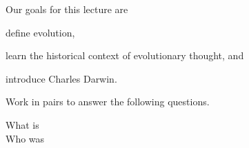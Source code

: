 \documentclass[t]{beamer}
\begin{document}
\begin{frame}{Our goals for this lecture are}
	
	\hangpara define evolution, 
	
	\hangpara learn the historical context of evolutionary thought, and

	\hangpara introduce Charles Darwin.

\end{frame}

%

%
\begin{frame}[t,plain]{Work in pairs to answer the following questions.}
	\vspace{2ex}
	
	\hangpara What is  \onslide<2->\\[2\baselineskip]
	

	\onslide<1->\hangpara Who was 

\end{frame}
\end{document}
